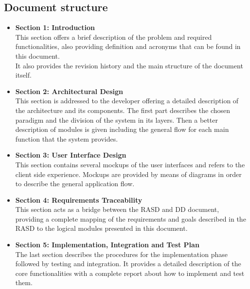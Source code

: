 \subsection{Document structure}
\begin{itemize}
    \item \textbf{Section 1: Introduction}\\
    This section offers a brief description of the problem and required functionalities, also providing definition and acronyms that can be found in this document.\\
    It also provides the revision history and the main structure of the document itself.
    
    \item \textbf{Section 2: Architectural Design}\\
    This section is addressed to the developer offering a detailed description of the architecture and its components. The first part describes the chosen paradigm and the division of the system in its layers. Then a better description of modules is given including the general flow for each main function that the system provides.
    
    \item \textbf{Section 3: User Interface Design}\\
    This section contains several mockups of the user interfaces and refers to the client side experience. Mockups are provided by means of diagrams in order to describe the general application flow.
    
    \item \textbf{Section 4: Requirements Traceability}\\
    This section acts as a bridge between the RASD and DD document, providing a complete mapping of the requirements and goals described in the RASD to the logical modules presented in this document.
    
    \item \textbf{Section 5: Implementation, Integration and Test Plan}\\
    The last section describes the procedures for the implementation phase followed by testing and integration. It provides a detailed description of the core functionalities with a complete report about how to implement and test them.
    
\end{itemize}